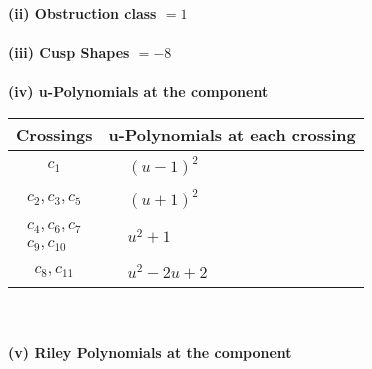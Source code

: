 \documentclass[1p]{elsarticle_modified}
\theoremstyle{definition}
\begin{document}
\flushleft \textbf{(ii) Obstruction class $= 1$}\\~\\
\flushleft \textbf{(iii) Cusp Shapes $= -8$}\\~\\
\newpage\renewcommand{\arraystretch}{1}
\flushleft \textbf{(iv) u-Polynomials at the component}\newline \\
\begin{tabular}{m{50pt}|m{274pt}}
Crossings & \hspace{64pt}u-Polynomials at each crossing \\
\hline $$\begin{aligned}c_{1}\end{aligned}$$&$\begin{aligned}
&(u-1)^2
\end{aligned}$\\
\hline $$\begin{aligned}c_{2},c_{3},c_{5}\end{aligned}$$&$\begin{aligned}
&(u+1)^2
\end{aligned}$\\
\hline $$\begin{aligned}c_{4},c_{6},c_{7}\\c_{9},c_{10}\end{aligned}$$&$\begin{aligned}
&u^2+1
\end{aligned}$\\
\hline $$\begin{aligned}c_{8},c_{11}\end{aligned}$$&$\begin{aligned}
&u^2-2 u+2
\end{aligned}$\\
\hline
\end{tabular}\\~\\
\newpage\renewcommand{\arraystretch}{1}
\flushleft \textbf{(v) Riley Polynomials at the component}\newline \\
\end{document}
